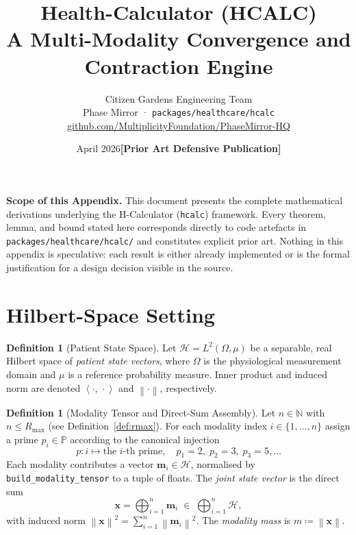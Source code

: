 \documentclass[11pt,a4paper]{article}
\title{%
  \textbf{Health-Calculator (HCALC)}\\[4pt]
  \large A Multi-Modality Convergence and Contraction Engine\\[6pt]
}
\author{%
  Citizen Gardens Engineering Team\\
  \small Phase Mirror · \texttt{packages/healthcare/hcalc}\\
  \small \href{https://github.com/MultiplicityFoundation/PhaseMirror-HQ}%
              {github.com/MultiplicityFoundation/PhaseMirror-HQ}
}
\date{April 2026\quad\textbf{[Prior Art Defensive Publication]}}
\theoremstyle{tealstyle}
\theoremstyle{definition}
\newtheorem{definition}[theorem]{Definition}
\newcommand{\Hilb}{\mathcal{H}}
\newcommand{\norm}[1]{\left\lVert #1 \right\rVert}
\newcommand{\ip}[2]{\left\langle #1,\, #2 \right\rangle}
\newcommand{\N}{\mathbb{N}}
\newcommand{\Primes}{\mathbb{P}}
\newcommand{\Rmax}{R_{\max}}
\newcommand{\primed}{p}
\begin{document}
\maketitle
\tableofcontents
\bigskip

\begin{tealbox}
\textbf{Scope of this Appendix.}\;
This document presents the complete mathematical derivations underlying the
H-Calculator (\texttt{hcalc}) framework.
Every theorem, lemma, and bound stated here corresponds directly to
code artefacts in \texttt{packages/healthcare/hcalc/} and constitutes
explicit prior art.
Nothing in this appendix is speculative: each result is either already
implemented or is the formal justification for a design decision visible in
the source.
\end{tealbox}

\section{Hilbert-Space Setting}
\label{sec:setting}

\begin{definition}[Patient State Space]
\label{def:state-space}
Let $\Hilb = L^2(\Omega,\mu)$ be a separable, real Hilbert space of
\emph{patient state vectors}, where $\Omega$ is the physiological measurement
domain and $\mu$ is a reference probability measure.
Inner product and induced norm are denoted $\ip{\cdot}{\cdot}$ and
$\norm{\cdot}$, respectively.
\end{definition}

\begin{definition}[Modality Tensor and Direct-Sum Assembly]
\label{def:assembly}
Let $n \in \N$ with $n \le \Rmax$ (see Definition~\ref{def:rmax}).
For each modality index $i \in \{1,\dots,n\}$ assign a prime
$\primed_i \in \Primes$ according to the canonical injection
\[
  \primed\colon i \mapsto \text{the } i\text{-th prime},
  \quad \primed_1 = 2,\; \primed_2 = 3,\; \primed_3 = 5, \ldots
\]
Each modality contributes a vector $\bm{m}_i \in \Hilb$,
normalised by \texttt{build\_modality\_tensor} to a tuple of floats.
The \emph{joint state vector} is the direct sum
\[
  \bm{x} = \bigoplus_{i=1}^{n} \bm{m}_i \;\in\; \bigoplus_{i=1}^{n}\Hilb,
\]
with induced norm $\norm{\bm{x}}^2 = \sum_{i=1}^{n}\norm{\bm{m}_i}^2$.
The \emph{modality mass} is $m \coloneqq \norm{\bm{x}}$.
\end{definition}
\end{document}
